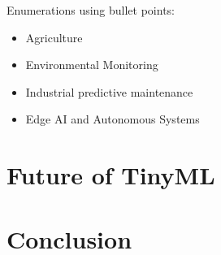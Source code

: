 \documentclass[twocolumn]{article}
\begin{document}
Enumerations using bullet points:

\begin{itemize}
	\item 	Agriculture
	\item 	Environmental Monitoring
	\item 	Industrial predictive maintenance
	\item 	Edge AI and Autonomous Systems
\end{itemize}


\section{Future of TinyML }
\label{future_of_tinyml}



\section{Conclusion}
\label{conclusion}



\nocite{hussein_original_2024,paul_rethinking_2021}




\end{document}
